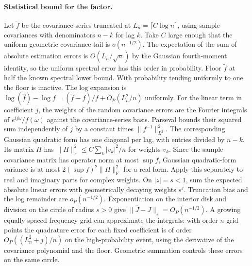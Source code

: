 \documentclass[12pt]{article}
\theoremstyle{definition}
\theoremstyle{remark}
\begin{document}
\paragraph{Statistical bound for the factor.}
Let $\tilde f$ be the covariance series truncated at $L_n=\lceil C\log n\rceil$,
using sample covariances with denominators $n-k$ for lag $k$. Take $C$ large
enough that the uniform geometric covariance tail is $o(n^{-1/2})$.
The expectation of the sum of absolute estimation errors is $O(L_n/\sqrt n)$
by the Gaussian fourth-moment identity, so the uniform spectral error has this
order in probability. Floor $\tilde f$ at half the known spectral lower bound.
With probability tending uniformly to one the floor is inactive. The log
expansion is $\log(\hat f)-\log f=(\tilde f-f)/f+O_P(L_n^2/n)$ uniformly.
For the linear term in coefficient $j$, the weights of the random covariance
errors are the Fourier integrals of $e^{ij\omega}/f(\omega)$ against the
covariance-series basis. Parseval bounds their squared sum independently of
$j$ by a constant times $\|f^{-1}\|_{L^2}^2$. The corresponding Gaussian
quadratic form has one diagonal per lag, with entries divided by $n-k$.
Its matrix $H$ has $\|H\|_{\mathrm F}^2\le C\sum_k|v_k|^2/n$ for weights
$v_k$. Since the sample covariance matrix has operator norm at most
$\sup f$, Gaussian quadratic-form variance is at most
$2(\sup f)^2\|H\|_{\mathrm F}^2$ for a real form. Apply this separately to
real and imaginary parts for complex weights. On $|z|=s<1$, sum the expected
absolute linear errors with geometrically decaying weights $s^j$.
Truncation bias and the log remainder are $o_P(n^{-1/2})$. Exponentiation on
the interior disk and division on the circle of radius $s>0$ give
$\|\hat J-J\|_s=O_P(n^{-1/2})$. A growing equally spaced frequency grid can
approximate the integrals: with order $n$ grid points the quadrature error
for each fixed coefficient is of order $O_P((L_n^2+j)/n)$ on the
high-probability event, using the derivative of the covariance polynomial
and the floor. Geometric summation controls these errors on the same circle.
\end{document}
